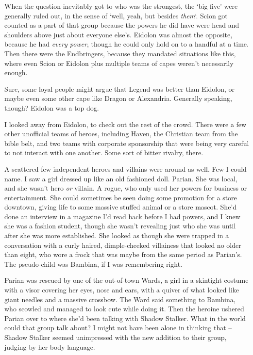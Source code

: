 When the question inevitably got to who was the strongest, the `big five' were generally ruled out, in the sense of `well, yeah, but besides \emph{them}`.  Scion got counted as a part of that group because the powers he did have were head and shoulders above just about everyone else's.  Eidolon was almost the opposite, because he had \emph{every power}, though he could only hold on to a handful at a time.  Then there were the Endbringers, because they mandated situations like this, where even Scion or Eidolon plus multiple teams of capes weren't necessarily enough.



Sure, some loyal people might argue that Legend was better than Eidolon, or maybe even some other cape like Dragon or Alexandria.  Generally speaking, though?  Eidolon was a top dog.



I looked away from Eidolon, to check out the rest of the crowd.  There were a few other unofficial teams of heroes, including Haven, the Christian team from the bible belt, and two teams with corporate sponsorship that were being very careful to not interact with one another.  Some sort of bitter rivalry, there.



A scattered few independent heroes and villains were around as well.  Few I could name.  I saw a girl dressed up like an old fashioned doll.  Parian.  She was local, and she wasn't hero \emph{or} villain.  A rogue, who only used her powers for business or entertainment.  She could sometimes be seen doing some promotion for a store downtown, giving life to some massive stuffed animal or a store mascot.  She'd done an interview in a magazine I'd read back before I had powers, and I knew she was a fashion student, though she wasn't revealing just who she was until after she was more established.  She looked as though she were trapped in a conversation with a curly haired, dimple-cheeked villainess that looked no older than eight, who wore a frock that was maybe from the same period as Parian's.  The pseudo-child was Bambina, if I was remembering right.



Parian was rescued by one of the out-of-town Wards, a girl in a skintight costume with a visor covering her eyes, nose and ears, with a quiver of what looked like giant needles and a massive crossbow.  The Ward said something to Bambina, who scowled and managed to look cute while doing it.  Then the heroine ushered Parian over to where she'd been talking with Shadow Stalker.  What in the world could that group talk about?  I might not have been alone in thinking that – Shadow Stalker seemed unimpressed with the new addition to their group, judging by her body language.



